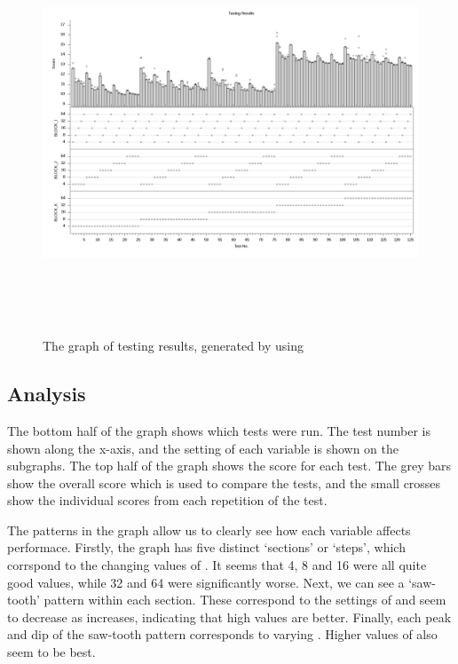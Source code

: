 \documentclass[a4paper]{article}
\begin{document}
\begin{landscape}
\begin{figure}[p]
\begin{center}
\includegraphics[height=12cm]{tutorial_files/matrix_plot.png}
\caption{The graph of testing results, generated by  using 
}
\label{fig:tuning-results-graph}
\end{center}
\end{figure}
\end{landscape}







\subsection{Analysis}
The bottom half of the graph shows which tests were run. The test number is 
shown along the x-axis, and the setting of each variable is shown on the 
subgraphs. The top half of the graph shows the score for 
each test. The grey bars show the overall score which is used to compare the 
tests, and the small crosses show the individual scores from each repetition 
of the test.

The patterns in the graph allow us to clearly see how each variable affects 
performace. Firstly, the graph has five distinct `sections' or `steps', 
which corrspond to the changing values of . It seems 
that 4, 8 and 16 were all quite good values, while 32 and 64 were 
significantly worse. Next, we can see a `saw-tooth' pattern within each 
section. These correspond to the settings of  and seem to 
decrease as  increases, indicating that high values are better.
Finally, each peak and dip of the saw-tooth pattern corresponds to varying 
. Higher values of  also seem to be best.
\end{document}
